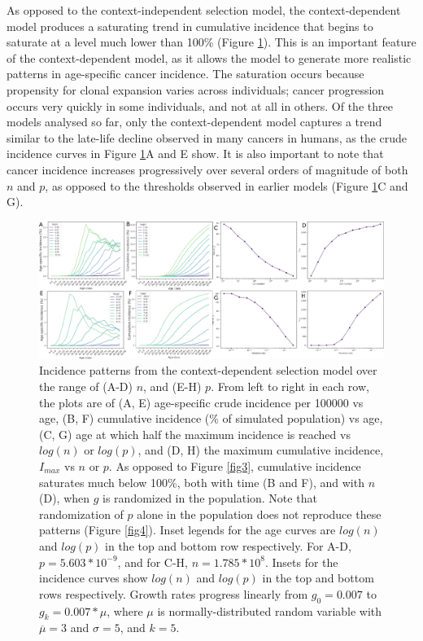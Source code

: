 \documentclass[10pt,twocolumn,twoside]{article}
\begin{document}
As opposed to the context-independent selection model, the context-dependent model produces a saturating trend in cumulative incidence that begins to saturate at a level much lower than 100\% (Figure \ref{fig5}). This is an important feature of the context-dependent model, as it allows the model to generate more realistic patterns in age-specific cancer incidence. The saturation occurs because propensity for clonal expansion varies across individuals; cancer progression occurs very quickly in some individuals, and not at all in others. Of the three models analysed so far, only the context-dependent model captures a trend similar to the late-life decline observed in many cancers in humans, as the crude incidence curves in Figure \ref{fig5}A and E show. It is also important to note that cancer incidence increases progressively over several orders of magnitude of both $n$ and $p$, as opposed to the thresholds observed in earlier models (Figure \ref{fig5}C and G).

\begin{figure}[tbhp]
	\centering
	\includegraphics[width=\linewidth, keepaspectratio=true]{fig5.png}
	\caption{Incidence patterns from the context-dependent selection model over the range of (A-D) $n$, and (E-H) $p$. From left to right in each row, the plots are of (A, E) age-specific crude incidence per 100000 vs age, (B, F) cumulative incidence (\% of simulated population) vs age, (C, G) age at which half the maximum incidence is reached vs $log(n)$ or $log(p)$, and (D, H) the maximum cumulative incidence, $I_{max}$ vs $n$ or $p$. As opposed to Figure \ref{fig3}, cumulative incidence saturates much below 100\%, both with time (B and F), and with $n$ (D), when $g$ is randomized in the population. Note that randomization of $p$ alone in the population does not reproduce these patterns (Figure \ref{fig4}). Inset legends for the age curves are $log(n)$ and $log(p)$ in the top and bottom row respectively. For A-D, $p=5.603*10^{-9}$, and for C-H, $n=1.785*10^{8}$. Insets for the incidence curves show $log(n)$ and $log(p)$ in the top and bottom rows respectively. Growth rates progress linearly from $g_{0}=0.007$ to $g_{k}=0.007*\mu$, where $\mu$ is normally-distributed random variable with $\overline{\mu}=3$ and $\sigma=5$, and $k=5$.}
	\label{fig5}
\end{figure}
\end{document}
